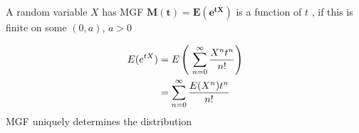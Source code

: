 
\begin{slide}
\begin{shaded}
\noindent{}A random variable $X$ has MGF $\mathbf{M(t) = E(e^{tX})}$ is a function of $t$ , if this is finite on some $(0,a)$, $a>0$
\end{shaded}
\begin{align*}
  E(e^{tX})&= E\left(\ \sum_{n=0}^{\infty} {X^nt^n \over n!}\right) \\&= \sum_{n=0}^{\infty} {E(X^n) t^n \over n!}
\end{align*}
MGF uniquely determines the distribution
\end{slide}